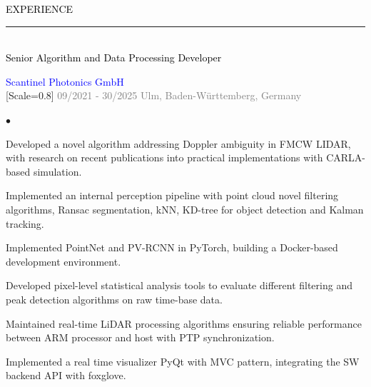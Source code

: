 {\setmainfont{Rubik Medium}\fontsize{11}{14}\selectfont\textcolor{black}{EXPERIENCE}}\\[-4pt]
\textcolor{black}{\rule{\textwidth}{2pt}}\\[-4pt]

{\setmainfont{Rubik Medium}\fontsize{10}{14}\selectfont\textcolor{black}{Senior Algorithm and Data Processing Developer}}

{\setmainfont{Rubik Medium}\fontsize{10}{14}\selectfont\textcolor{blue}{Scantinel Photonics GmbH}}\\[-6pt]

{[Scale=0.8]
\textcolor{gray}{
\faCalendar\hspace{4pt}09/2021 - 30/2025\hspace{1.5em}
\faMapMarker*\hspace{4pt}Ulm, Baden-Württemberg, Germany
}}\\[-10pt]

{\setmainfont{Rubik Light}\fontsize{10}{13}\selectfont
\color{gray}
\begin{list}{$\bullet$}{
  \setlength{\topsep}{1pt}
  \setlength{\itemsep}{1pt}
  \setlength{\parsep}{0pt}
  \setlength{\parskip}{0pt}
  \setlength{\leftmargin}{12pt}   %
  \setlength{\labelsep}{4pt}      %
}
  \item Developed a novel algorithm addressing Doppler ambiguity in FMCW LIDAR, with research on recent publications into practical implementations with CARLA-based simulation.
  \item Implemented an internal perception pipeline with point cloud novel filtering algorithms, Ransac segmentation, kNN, KD-tree for object detection and Kalman tracking.
  \item Implemented PointNet and PV-RCNN in PyTorch, building a Docker-based development environment.
  \item Developed pixel-level statistical analysis tools to evaluate different filtering and peak detection algorithms on raw time-base data. 
  \item Maintained real-time LiDAR processing algorithms ensuring reliable performance between ARM processor and host with PTP synchronization.
  \item Implemented a real time visualizer PyQt with MVC pattern, integrating the SW backend API with foxglove.
\end{list}
}

